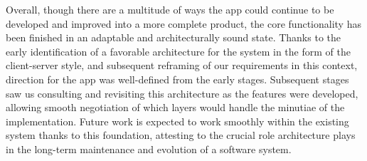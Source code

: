 Overall, though there are a multitude of ways the app could continue to be developed and improved into a more complete product, the core functionality has been finished in an adaptable and architecturally sound state. Thanks to the early identification of a favorable architecture for the system in the form of the client-server style, and subsequent reframing of our requirements in this context, direction for the app was well-defined from the early stages. Subsequent stages saw us consulting and revisiting this architecture as the features were developed, allowing smooth negotiation of which layers would handle the minutiae of the implementation. Future work is expected to work smoothly within the existing system thanks to this foundation, attesting to the crucial role architecture plays in the long-term maintenance and evolution of a software system.
